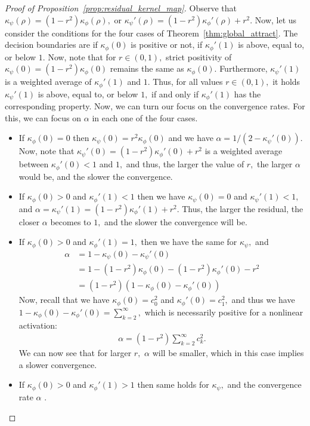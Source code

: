 \documentclass[twoside]{article}
\newcommand{\km}{\kappa_\phi}
\theoremstyle{definition}
\begin{document}
\begin{proof}[Proof of Proposition~\ref{prop:residual_kernel_map}]
Observe that $\kappa_\psi(\rho) = (1-r^2) \km(\rho),$ or $\kappa_\psi'(\rho) = (1-r^2) \km'(\rho) + r^2.$ Now, let us consider the conditions for the four cases of Theorem~\ref{thm:global_attract}. The decision boundaries are if $\km(0)$ is positive or not, if $\km'(1)$ is above, equal to, or below $1.$ Now, note that for $r \in (0,1),$ strict positivity of $\kappa_\psi(0) = (1-r^2) \km(0)$ remains the same as $\km(0).$ Furthermore, $\kappa_\psi'(1)$ is a weighted average of $\km'(1)$ and $1.$ Thus, for all values $r\in(0,1),$ it holds $\kappa_\psi'(1)$ is above, equal to, or below $1,$ if and only if $\km'(1)$ has the corresponding property. Now, we can turn our focus on the convergence rates. For this, we can focus on $\alpha$ in each one of the four cases. 
\begin{itemize}
    \item If $\km(0)=0$ then $\kappa_\psi(0) = r^2 \km(0)$ and we have $\alpha = 1 / (2-\kappa_\psi'(0)).$ Now, note that $\kappa_\psi'(0) = (1-r^2)\km'(0) +  r^2$ is a weighted average between $\km'(0) < 1$ and $1,$ and thus, the larger the value of $r,$ the larger $\alpha$ would be, and the slower the convergence. 
    \item If $\km(0)>0$ and $\km'(1)<1$ then we have $\kappa_\psi(0)=0$ and $\kappa_\psi'(1) < 1,$ and $\alpha = \kappa_\psi'(1) = (1-r^2) \km'(1) + r^2.$ Thus, the larger the residual, the closer $\alpha$ becomes to $1,$ and the slower the convergence will be.  
    \item If $\km(0)>0$ and $\km'(1)=1,$ then we have the same for $\kappa_\psi,$ and 
    \begin{align*}
        \alpha &= 1 - \kappa_\psi(0) - \kappa_\psi'(0)\\
        &= 1 - (1-r^2) \km(0) - (1-r^2)\km'(0) - r^2\\
        &= (1-r^2 )( 1 - \km(0) - \km'(0))
    \end{align*}
    Now, recall that we have $\km(0) = c_0^2$ and $\km'(0)=c_1^2,$ and thus we have $1-\km(0) - \km'(0) = \sum_{k=2}^\infty,$ which is necessarily positive for a nonlinear activation:
    \begin{align*}
        \alpha = (1-r^2) \sum_{k=2}^\infty c_k^2.
    \end{align*}
    We can now see that for larger $r,$ $\alpha $ will be smaller, which in this case implies a slower convergence. 
    \item If $\km(0)>0$ and $\km'(1) > 1$ then same holds for $\kappa_\psi,$ and the convergence rate $\alpha$ .
\end{itemize}

\end{proof}
\end{document}
